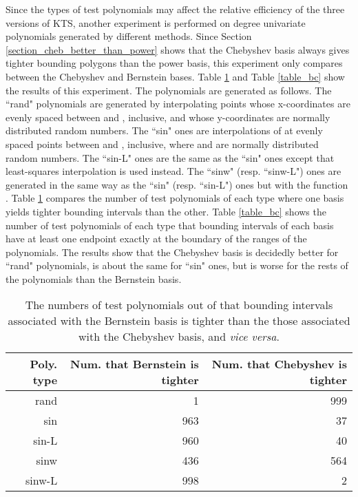 \documentclass[12pt]{article}
\begin{document}
Since the types of test polynomials may affect the relative
efficiency of the three versions of KTS, another experiment is
performed on degree  univariate polynomials generated by
different methods.  Since Section
\ref{section_cheb_better_than_power} shows that the Chebyshev
basis always gives tighter bounding polygons than the power basis,
this experiment only compares between the Chebyshev and Bernstein
bases.  Table \ref{table_bb} and Table \ref{table_bc} show the
results of this experiment.  The polynomials are generated as
follows. The ``rand" polynomials are generated by interpolating
points whose x-coordinates are evenly spaced between  and ,
inclusive, and whose y-coordinates are normally distributed random
numbers. The ``sin" ones are interpolations of  at
evenly spaced points between  and , inclusive, where 
and  are normally distributed random numbers.  The ``sin-L"
ones are the same as the ``sin" ones except that least-squares
interpolation is used instead. The ``sinw" (resp. ``sinw-L") ones
are generated in the same way as the ``sin" (resp. ``sin-L") ones
but with the function . Table \ref{table_bb} compares
the number of test polynomials of each type where one basis yields
tighter bounding intervals than the other.  Table \ref{table_bc}
shows the number of test polynomials of each type that bounding
intervals of each basis have at least one endpoint exactly at the
boundary of the ranges of the polynomials. The results show that
the Chebyshev basis is decidedly better for ``rand" polynomials,
is about the same for ``sin" ones, but is worse for the rests of
the polynomials than the Bernstein basis.
\begin{table}
\caption{The numbers of test polynomials out of  that
bounding intervals associated with the Bernstein basis is tighter
than the those associated with the Chebyshev basis, and \emph{vice
versa}. \label{table_bb} } \begin{center}
\begin{tabular}{|r|r|r|}
\hline Poly. type & Num. that Bernstein is tighter & Num. that Chebyshev is tighter\\
\hline \hline
rand & 1 & 999 \\
sin & 963 & 37 \\
sin-L & 960 & 40 \\
sinw & 436 & 564 \\
sinw-L & 998 & 2 \\
\hline
\end{tabular}
\end{center}
\end{table}
\end{document}
